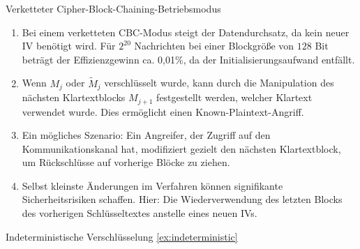 \documentclass{article}
\begin{document}
\begin{exercise}{Verketteter Cipher-Block-Chaining-Betriebsmodus}
  \begin{solution}
    \begin{enumerate}
        \item Bei einem verketteten CBC-Modus steigt der Datendurchsatz, da kein neuer IV benötigt wird. Für $ 2^{20} $ Nachrichten bei einer Blockgröße von $ 128 $ Bit beträgt der Effizienzgewinn ca. 0,01\%, da der Initialisierungsaufwand entfällt.
        \item Wenn $ M_j $ oder $ \tilde{M}_j $ verschlüsselt wurde, kann durch die Manipulation des nächsten Klartextblocks $ M_{j+1} $ festgestellt werden, welcher Klartext verwendet wurde. Dies ermöglicht einen Known-Plaintext-Angriff.
        \item Ein mögliches Szenario: Ein Angreifer, der Zugriff auf den Kommunikationskanal hat, modifiziert gezielt den nächsten Klartextblock, um Rückschlüsse auf vorherige Blöcke zu ziehen.
        \item Selbst kleinste Änderungen im Verfahren können signifikante Sicherheitsrisiken schaffen. Hier: Die Wiederverwendung des letzten Blocks des vorherigen Schlüsseltextes anstelle eines neuen IVs.
    \end{enumerate}
  \end{solution}
\end{exercise}

\begin{exercise}{Indeterministische Verschlüsselung \ref{ex:indeterministic}}\end{exercise}
\end{document}
